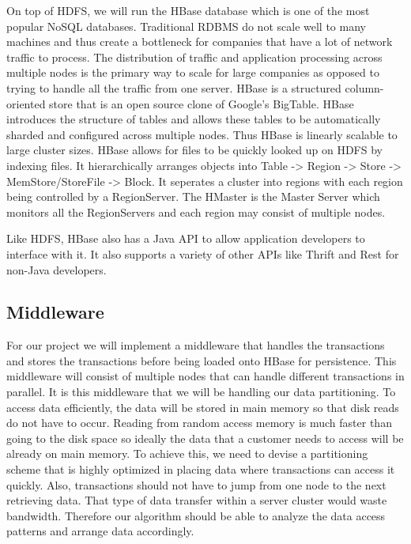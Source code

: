 \documentclass[10pt,final,journal]{IEEEtran}
\begin{document}
On top of HDFS, we will run the HBase database which is one of the most popular NoSQL databases. Traditional RDBMS do not scale well to many machines and thus create a bottleneck for companies that have a lot of network traffic to process. The distribution of traffic and application processing across multiple nodes is the primary way to scale for large companies as opposed to trying to handle all the traffic from one server.  HBase is a structured column-oriented store that is an open source clone of Google’s BigTable.  HBase introduces the structure of tables and allows these tables to be automatically sharded and configured across multiple nodes.  Thus HBase is linearly scalable to large cluster sizes.  HBase allows for files to be quickly looked up on HDFS by indexing files.  It hierarchically arranges objects into Table -> Region -> Store -> MemStore/StoreFile -> Block.  It seperates a cluster into regions with each region being controlled by a RegionServer.  The HMaster is the Master Server which monitors all the RegionServers and each region may consist of multiple nodes.

Like HDFS, HBase also has a Java API to allow application developers to interface with it.  It also supports a variety of other APIs like Thrift and Rest for non-Java developers.

\subsection{Middleware}
For our project we will implement a middleware that handles the transactions and stores the transactions before being loaded onto HBase for persistence.  This middleware will consist of multiple nodes that can handle different transactions in parallel.  It is this middleware that we will be handling our data partitioning.  To access data efficiently, the data will be stored in main memory so that disk reads do not have to occur.  Reading from random access memory is much faster than going to the disk space so ideally the data that a customer needs to access will be already on main memory.  To achieve this, we need to devise a partitioning scheme that is highly optimized in placing data where transactions can access it quickly.  Also, transactions should not have to jump from one node to the next retrieving data.  That type of data transfer within a server cluster would waste bandwidth.  Therefore our algorithm should be able to analyze the data access patterns and arrange data accordingly.
\end{document}
